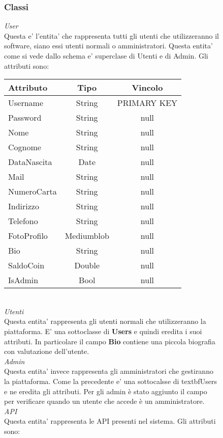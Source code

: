 {{\begin{figure}[ht]
			\subsubsection{Classi}
			\textit{User}\\
			Questa e' l'entita' che rappresenta tutti gli utenti che utilizzeranno il software, siano essi utenti normali o amministratori. Questa entita' come si vede dallo schema e' superclase di Utenti e di Admin. Gli attributi sono: 
			\begin{center}
			\begin{tabular}{lcc}
				\textbf{Attributo}&\textbf{Tipo}&\textbf {Vincolo}\\
				\hline
				Username&String&PRIMARY KEY\\
				Password&String&null\\
				Nome&String&null \\
				Cognome&String&null \\
				DataNascita&Date&null\\
				Mail&String&null \\
				NumeroCarta&String&null \\
				Indirizzo&String&null \\
				Telefono&String&null \\
				FotoProfilo&Mediumblob&null\\
				Bio&String&null \\
				SaldoCoin&Double&null \\
				IsAdmin&Bool&null\\
			\end{tabular}
			\end{center} \\
			\textit{Utenti}\\
			Questa entita' rappresenta gli utenti normali che utilizzeranno la piattaforma. E' una sottoclasse di \textbf{Users} e quindi eredita i suoi attributi. In particolare il campo \textbf{Bio} contiene una piccola biografia con valutazione dell'utente.  \\
			\textit{Admin}\\
			Questa entita' invece rappresenta gli amministratori che gestiranno la piattaforma. Come la precedente e' una sottocalsse di textbf{Users} e ne eredita gli attributi. Per gli admin è stato aggiunto il campo  per verificare quando un utente che accede è un amministratore. \\
			\textit{API}\\
			Questa entita' rappresenta le API presenti nel sistema. Gli attributi sono:

\end{figure}}}
